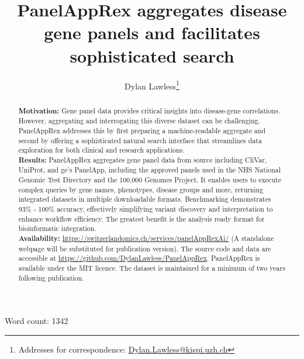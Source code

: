 
\usepackage[printonlyused,withpage,nohyperlinks]{acronym}


\title{PanelAppRex aggregates disease gene panels and facilitates sophisticated search}	
\author[1]{Dylan Lawless\thanks{Addresses for correspondence: \href{mailto:Dylan.Lawless@kispi.uzh.ch}{Dylan.Lawless@kispi.uzh.ch}}}


\maketitle
\justify

\maketitle
Word count: 1342

\begin{abstract}
\noindent
\textbf{Motivation:} Gene panel data provides critical insights into disease-gene correlations. However, aggregating and interrogating this diverse dataset can be challenging. PanelAppRex addresses this by first preparing a machine-readable aggregate and second by offering a sophisticated natural search interface that streamlines data exploration for both clinical and research applications.\\[1ex]
\textbf{Results:} PanelAppRex aggregates gene panel data from source including CliVar, UniProt, and \ac{ge}’s PanelApp, including the approved panels used in the NHS National Genomic Test Directory and the 100,000 Genomes Project. It enables users to execute complex queries by gene names, phenotypes, disease groups and more, returning integrated datasets in multiple downloadable formats. Benchmarking demonstrates 
93\% - 100\% accuracy, effectively simplifying variant discovery and interpretation to enhance workflow efficiency. The greatest benefit is the analysis ready format for bioinformatic integration. \\[1ex]
\noindent \textbf{Availability:} \url{https://switzerlandomics.ch/services/panelAppRexAi/} (A standalone webpage will be substituted for publication version).
The source code and data are accessible at \url{https://github.com/DylanLawless/PanelAppRex}. PanelAppRex is available under the MIT licence. 
The dataset is maintained for a minimum of two years following publication.
\end{abstract}
\clearpage


